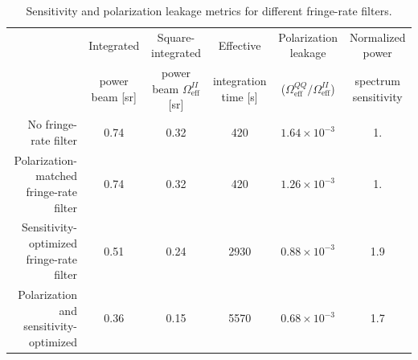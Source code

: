 \documentclass[twocolumn,apj,numberedappendix]{emulateapj}
\begin{document}
\begin{table}[htbp]
   \caption{Sensitivity and polarization leakage metrics for different fringe-rate filters.}
   \centering
   \begin{tabular}{@{} rccccc @{}} %
      \toprule
       & Integrated & Square-integrated & Effective  & Polarization leakage& Normalized power\\
       & power beam [sr] & power beam $\Omega^{II}_\textrm{eff}$ [sr] &integration time [s] &  ($\Omega^{QQ}_\textrm{eff}/\Omega^{II}_\textrm{eff}$) & spectrum sensitivity\\
      \midrule
       No fringe-rate filter & 0.74& 0.32 & 420 & $1.64\times10^{-3}$  & 1. \\
       Polarization-matched fringe-rate filter & 0.74  & 0.32  & 420& $1.26\times10^{-3}$ & 1. \\
       Sensitivity-optimized fringe-rate filter & 0.51  & 0.24  & 2930 & $0.88\times10^{-3}$ & 1.9\\ %
       Polarization and sensitivity-optimized & 0.36  & 0.15  & 5570 & $0.68\times10^{-3}$ & 1.7 \\
      \bottomrule
   \end{tabular}

   \label{tbl:beam_metrics}
\end{table}
\end{document}
